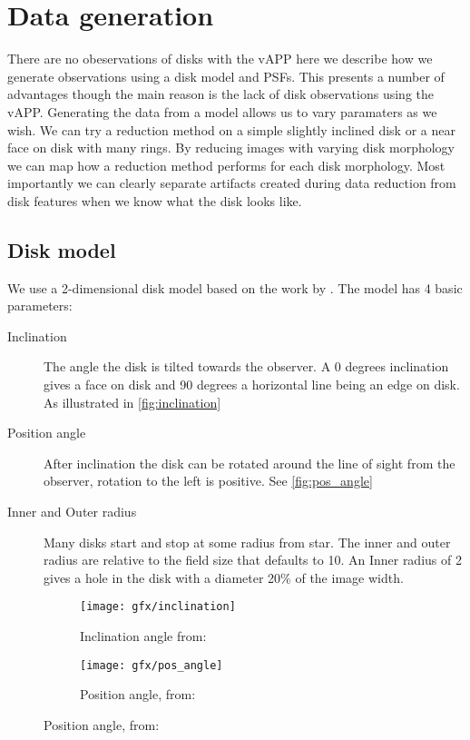 
\chapter{Data generation} %
\label{ch:data_gen} %

There are no obeservations of disks with the \ac{vAPP} here we describe how we generate observations using a disk model and \acp{PSF}. This presents a number of advantages though the main reason is the lack of disk observations using the \ac{vAPP}. Generating the data from a model allows us to vary paramaters as we wish. We can try a reduction method on a simple slightly inclined disk or a near face on disk with many rings. By reducing images with varying disk morphology we can map how a reduction method performs for each disk morphology. Most importantly we can clearly separate artifacts created during data reduction from disk features when we know what the disk looks like.





\section{Disk model}

We use a 2-dimensional disk model based on the work by \cite{Pieter_Okko}. The model has 4 basic parameters: 

\begin{description}
\item[Inclination] The angle the disk is tilted towards the observer. A 0 degrees inclination gives a face on disk and 90 degrees a horizontal line being an edge on disk. As illustrated in \autoref{fig:inclination}
\item[Position angle] After inclination the disk can be rotated around the line of sight from the observer, rotation to the left is positive. See \autoref{fig:pos_angle}
\item[Inner and Outer radius] Many disks start and stop at some radius from star. The inner and outer radius are relative to the field size that defaults to 10. An Inner radius of 2 gives a hole in the disk with a diameter 20\% of the image width. %
\end{description}

\begin{figure}[h!]
  \centering
  \begin{subfigure}[b]{0.4\textwidth}
    \texttt{[image: gfx/inclination]}
    \caption{Inclination angle from: \cite{Pieter_Okko}}
    \label{fig:pos_angle}

  \end{subfigure}
  \begin{subfigure}[b]{0.4\textwidth}
    \texttt{[image: gfx/pos\_angle]}
    \caption{Position angle, from: \cite{Pieter_Okko}}
    \label{fig:inclination}
  \end{subfigure}
  \label{fig:1}
\end{figure}

